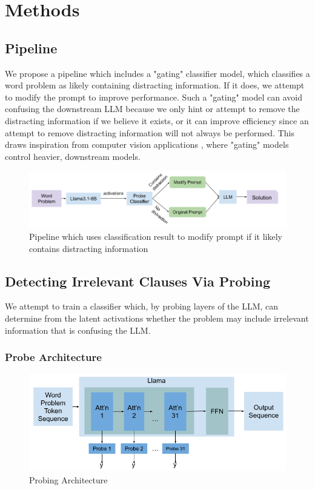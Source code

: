 \documentclass{article}
\begin{document}
\section{Methods}

\subsection{Pipeline}

We propose a pipeline which includes a "gating" classifier model, which classifies a word problem as likely containing distracting information. If it does, we attempt to modify the prompt to improve performance. Such a "gating" model can avoid confusing the downstream LLM because we only hint or attempt to remove the distracting information if we believe it exists, or it can improve efficiency since an attempt to remove distracting information will not always be performed. This draws inspiration from computer vision applications \citep{US20230091374A1}, where "gating" models control heavier, downstream models. 

\begin{figure}[h!]
    \centering
    \includegraphics[scale=0.4]{tex/finalreport230/pipeline_diagram_cropped.png}
    \caption{Pipeline which uses classification result to modify prompt if it likely contains distracting information}
    \label{fig:pipeline_diagram}
\end{figure}

\subsection{Detecting Irrelevant Clauses Via Probing}
We attempt to train a classifier which, by probing layers of the LLM, can determine from the latent activations whether the problem may include irrelevant information that is confusing the LLM. 

\subsubsection{Probe Architecture}

\begin{figure}[h!]
    \centering
    \includegraphics[width=0.7\linewidth]{tex/finalreport230/probe_diagram_cropped-2.png}
    \caption{Probing Architecture}
    \label{fig:variance_pooling_training}
\end{figure}
\end{document}
